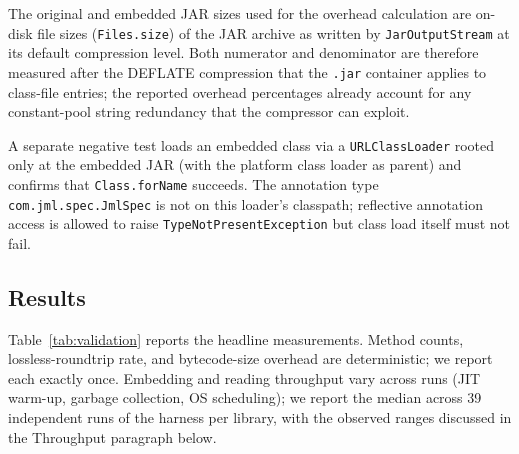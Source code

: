 The original and embedded JAR sizes used for the overhead calculation are on-disk file sizes (\texttt{Files.size}) of the JAR archive as written by \texttt{JarOutputStream} at its default compression level. Both numerator and denominator are therefore measured after the DEFLATE compression that the \texttt{.jar} container applies to class-file entries; the reported overhead percentages already account for any constant-pool string redundancy that the compressor can exploit.

A separate negative test loads an embedded class via a \texttt{URLClassLoader} rooted only at the embedded JAR (with the platform class loader as parent) and confirms that \texttt{Class.forName} succeeds. The annotation type \texttt{com.jml.spec.JmlSpec} is not on this loader's classpath; reflective annotation access is allowed to raise \texttt{TypeNotPresentException} but class load itself must not fail.

\subsection{Results}

Table~\ref{tab:validation} reports the headline measurements. Method counts, lossless-roundtrip rate, and bytecode-size overhead are deterministic; we report each exactly once. Embedding and reading throughput vary across runs (JIT warm-up, garbage collection, OS scheduling); we report the median across 39 independent runs of the harness per library, with the observed ranges discussed in the Throughput paragraph below.

